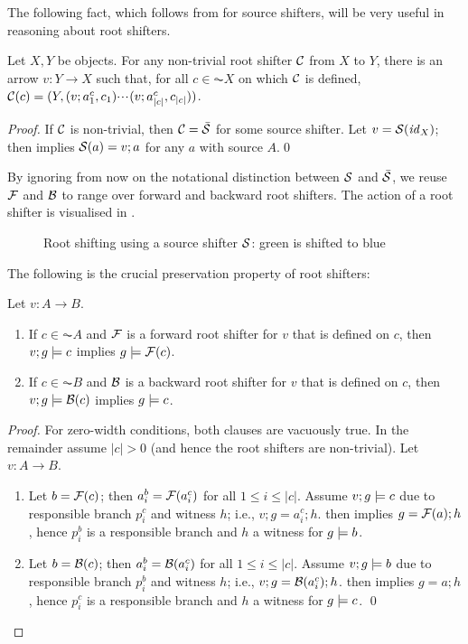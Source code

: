 \begin{fullorname}
The following fact, which follows from  for source shifters, will be very useful in reasoning about root shifters.
%
\begin{lemma}
Let $X,Y$ be objects. For any non-trivial root shifter $\mathcal{C}$ from $X$ to $Y$, there is an arrow $v:Y\to X$ such that, for all $c\in \AC X$ on which $\mathcal{C}$ is defined, $\mathcal{C}(c)= (Y,(v;a^c_1,c_1){\cdotp\mkern-2mu\cdotp\mkern-2mu\cdotp\mkern1mu} (v;a^c_{|c|},c_{|c|}))$.
\end{lemma}
%
\begin{proof}
If $\mathcal{C}$ is non-trivial, then $\mathcal{C}=\bar{\mathcal{S}}$ for some source shifter. Let $v=\mathcal{S}(\mathit{id}_X)$; then  implies $\mathcal{S}(a)=v;a$ for any $a$ with source $A$.\qed
\end{proof}
\end{fullorname}
%
By ignoring from now on the notational distinction between $\mathcal{S}$ and $\bar{\mathcal{S}}$, we reuse $\mathcal{F}$ and $\mathcal{B}$ to range over forward and backward root shifters. The action of a root shifter is visualised in .
%
\begin{figure}[t]
\centering

\caption{Root shifting using a source shifter $\mathcal{S}$: green is shifted to blue}
\end{figure}
%
The following is the crucial preservation property of root shifters:
%
\begin{proposition}
Let $v:A\to B$.
\begin{enumerate}[topsep=\smallskipamount]
\item If $c\in \AC A$ and $\mathcal{F}$ is a forward root shifter for $v$ that is defined on $c$, then $v;g\models c$ implies $g\models \mathcal{F}(c)$.
\item If $c\in \AC B$ and $\mathcal{B}$ is a backward root shifter for $v$ that is defined on $c$, then $v;g\models \mathcal{B}(c)$ implies $g\models c$.
\end{enumerate}
\end{proposition}
%
\begin{fullorname}
\begin{proof}
For zero-width conditions, both clauses are vacuously true. In the remainder assume $|c|>0$ (and hence the root shifters are non-trivial). Let $v:A\to B$.
\begin{enumerate}
\item Let $b=\mathcal{F}(c)$; then $a^b_i=\mathcal{F}(a^c_i)$ for all $1\leq i\leq |c|$. Assume $v;g\models c$ due to responsible branch $p^c_i$ and witness $h$; i.e., $v;g=a^c_i;h$.  then implies $g=\mathcal{F}(a);h$, hence $p^b_i$ is a responsible branch and $h$ a witness for $g\models b$.
\item Let $b=\mathcal{B}(c)$; then $a^b_i=\mathcal{B}(a^c_i)$ for all $1\leq i\leq |c|$. Assume $v;g\models b$ due to responsible branch $p^b_i$ and witness $h$; i.e., $v;g=\mathcal{B}(a^c_i);h$.  then implies $g=a;h$, hence $p^c_i$ is a responsible branch and $h$ a witness for $g\models c$.
\qed
\end{enumerate}
\end{proof}
\end{fullorname}
